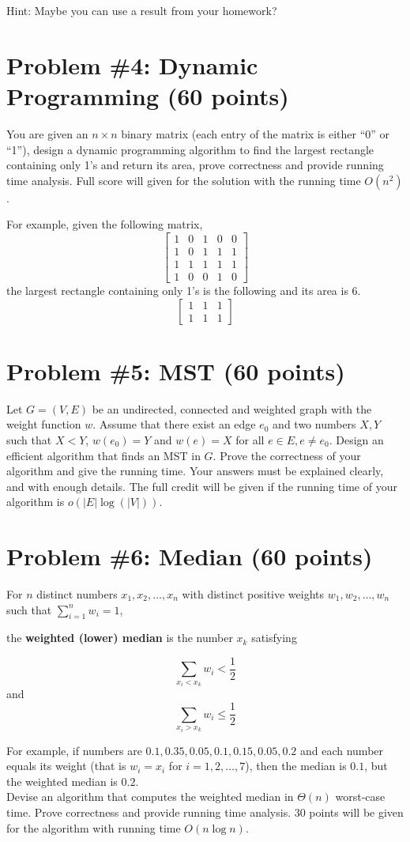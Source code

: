 \documentclass[letterpaper, 11pt]{article}
\begin{document}
Hint: Maybe you can use a result from your homework?

\newpage

\section{Problem \#4: \textbf{Dynamic Programming} (60 points)}

You are given an $n\times n$ binary matrix (each entry of the matrix is either ``0'' or ``1''), design a dynamic programming algorithm to find the largest
rectangle containing only 1's and return its area, prove correctness and provide running time analysis.
Full score will given for the solution with the running time $O(n^2)$.

For example, given the following matrix,
\[
  \begin{bmatrix}
    1 & 0 & 1 & 0 & 0\\
    1 & 0 & 1 & 1 & 1 \\
    1 & 1 & 1 & 1 & 1 \\
    1 & 0 & 0 & 1 & 0
  \end{bmatrix}
\]
the largest rectangle containing only 1's is the following and its area is 6.
\[
  \begin{bmatrix}
    1 & 1 & 1 \\
    1 & 1 & 1
  \end{bmatrix}
\]
\newpage

\section{Problem \#5: \textbf{MST} (60 points)}
Let $G=(V,E)$ be an undirected, connected and weighted graph with the weight function $w$.
Assume that there exist an edge $e_0$ and two numbers $X,Y$ such that $X<Y$, $w(e_0) = Y$ and $w(e) = X$ for all $e\in E, e\neq e_0$.
Design an efficient algorithm that finds an MST in $G$.
Prove the correctness of your algorithm and give the running time.
Your answers must be explained clearly, and with enough details.
The full credit will be given if the running time of your algorithm is $o(|E|\log(|V|))$.
\newpage

\section{Problem \#6: \textbf{Median} (60 points)}
For $n$ distinct numbers $x_1, x_2, \ldots, x_n$ with distinct positive weights $w_1, w_2, \ldots , w_n$ such that $\sum_{i=1}^n{w_i} = 1$,

the \textbf{weighted (lower) median} is the number $x_k$ satisfying

$$
\sum_{x_i < x_k} w_i < \frac{1}{2}
$$
and
$$
\sum_{x_i > x_k} w_i \le \frac{1}{2}
$$

For example, if numbers are $0.1, 0.35, 0.05, 0.1, 0.15, 0.05, 0.2$ and each number equals its weight (that is $w_i = x_i$ for $i = 1,2,\ldots, 7$), then the median is $0.1$, but the weighted median is $0.2$. \\

Devise an algorithm that computes the weighted median in $\Theta(n)$ worst-case time. Prove correctness and provide running time analysis. $30$ points will be given for the algorithm with running time $O(n\log n)$.
\end{document}

